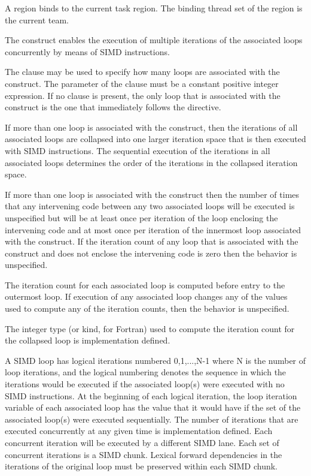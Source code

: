 \binding
A  region binds to the current task region. The binding thread set of the 
region is the current team.

\descr
The  construct enables the execution of multiple iterations of the associated loops
concurrently by means of SIMD instructions.

The  clause may be used to specify how many loops are associated with the
construct. The parameter of the  clause must be a constant positive integer
expression. If no  clause is present, the only loop that is associated with the
 construct is the one that immediately follows the directive.

If more than one loop is associated with the  construct, then the iterations of all
associated loops are collapsed into one larger iteration space that is then executed with
SIMD instructions. The sequential execution of the iterations in all associated loops
determines the order of the iterations in the collapsed iteration space.

If more than one loop is associated with the  construct
then the number of times that any intervening code between any two
associated loops will be executed is unspecified but will be at least
once per iteration of the loop enclosing the intervening code and at
most once per iteration of the innermost loop associated with the
construct.  If the iteration count of any loop that is associated with the 
construct and does not enclose the intervening code is zero then the behavior
is unspecified.


The iteration count for each associated loop is computed before entry to the outermost
loop. If execution of any associated loop changes any of the values used to compute any
of the iteration counts, then the behavior is unspecified.

The integer type (or kind, for Fortran) used to compute the iteration count for the
collapsed loop is implementation defined.

A SIMD loop has logical iterations numbered 0,1,...,N-1 where N is the
number of loop iterations, and the logical numbering denotes the
sequence in which the iterations would be executed if the associated
loop(s) were executed with no SIMD instructions.  At the beginning of
each logical iteration, the loop iteration variable of each associated
loop has the value that it would have if the set of the associated
loop(s) were executed sequentially. The number of iterations that are
executed concurrently at any given time is implementation defined.
Each concurrent iteration will be executed by a different SIMD lane.
Each set of concurrent iterations is a SIMD chunk.  Lexical forward
dependencies in the iterations of the original loop must be preserved
within each SIMD chunk.

